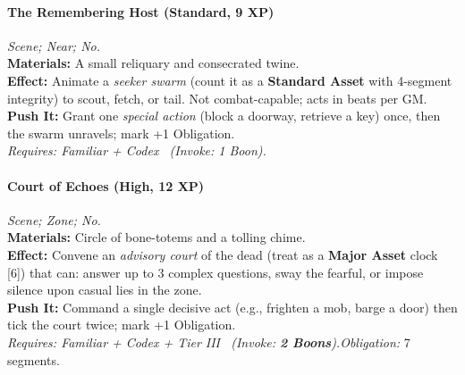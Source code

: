 \paragraph{The Remembering Host (Standard, 9 XP)} \emph{Scene; Near; No.}\\
\textbf{Materials:} A small reliquary and consecrated twine.\\
\textbf{Effect:} Animate a \emph{seeker swarm} (count it as a \textbf{Standard Asset} with 4-segment integrity) to scout, fetch, or tail. Not combat-capable; acts in beats per GM.\\
\textbf{Push It:} Grant one \emph{special action} (block a doorway, retrieve a key) once, then the swarm unravels; mark +1 Obligation.\\
\emph{Requires: Familiar + Codex \ (\textit{Invoke:} 1 Boon).}

\paragraph{Court of Echoes (High, 12 XP)} \emph{Scene; Zone; No.}\\
\textbf{Materials:} Circle of bone-totems and a tolling chime.\\
\textbf{Effect:} Convene an \emph{advisory court} of the dead (treat as a \textbf{Major Asset} clock [6]) that can: answer up to 3 complex questions, sway the fearful, or impose silence upon casual lies in the zone.\\
\textbf{Push It:} Command a single decisive act (e.g., frighten a mob, barge a door) then tick the court twice; mark +1 Obligation.\\
\emph{Requires: Familiar + Codex + Tier III \ (\textit{Invoke:} \textbf{2 Boons}).}\quad \emph{Obligation:} 7 segments.
